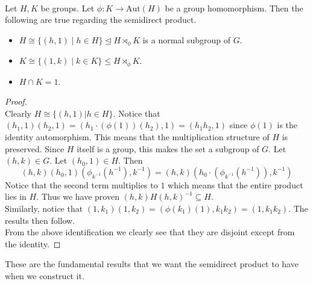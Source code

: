 \documentclass[a4paper]{article}
\begin{document}
\begin{prp}{}{}\\
Let $H,K$ be groups. Let $\phi:K\to\text{Aut}(H)$ be a group homomorphism. Then the following are true regarding the semidirect product. 
\begin{itemize}
\item $H\cong\{(h,1)\;|\;h\in H\}\trianglelefteq H\rtimes_\phi K$ is a normal subgroup of $G$. 
\item $K\cong\{(1,k)\;|\;k\in K\}\leq H\rtimes_\phi K$. 
\item $H\cap K=1$. 
\end{itemize}
\begin{proof}\\
Clearly $H\cong\{(h,1)|h\in H\}$. Notice that $(h_1,1)(h_2,1)=(h_1\cdot(\phi(1))(h_2),1)=(h_1h_2,1)$ since $\phi(1)$ is the identity automorphism. This means that the multiplication structure of $H$ is preserved. Since $H$ itself is a group, this makes the set a subgroup of $G$. Let $(h,k)\in G$. Let $(h_0,1)\in H$. Then $$(h,k)(h_0,1)(\phi_{k^{-1}}(h^{-1}),k^{-1})=(h,k)(h_0\cdot(\phi_{k^{-1}}(h^{-1})),k^{-1})$$ Notice that the second term multiplies to $1$ which means that the entire product lies in $H$. Thus we have proven $(h,k)H(h,k)^{-1}\subseteq H$. \\

Similarly, notice that $(1,k_1)(1,k_2)=(\phi(k_1)(1),k_1k_2)=(1,k_1k_2)$. The results then follow. \\

From the above identification we clearly see that they are disjoint except from the identity. 
\end{proof}
\end{prp}

These are the fundamental results that we want the semidirect product to have when we construct it. 
\end{document}
